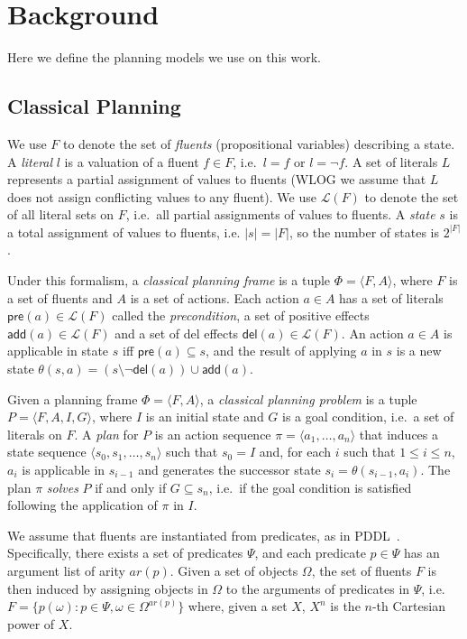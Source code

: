 \documentclass[letterpaper]{article} %
\newcommand{\tup}[1]{{\langle #1 \rangle}}
\newcommand{\pre}{\mathsf{pre}}     %
\newcommand{\del}{\mathsf{del}}     %
\newcommand{\add}{\mathsf{add}}     %
\begin{document}
\section{Background}
Here we define the planning models we use on this work.

\subsection{Classical Planning}
We use $F$ to denote the set of {\em fluents} (propositional variables) describing a state. A {\em literal} $l$ is a valuation of a fluent $f\in F$, i.e.~$l=f$ or $l=\neg f$. A set of literals $L$ represents a partial assignment of values to fluents (WLOG we assume that $L$ does not assign conflicting values to any fluent). We use $\mathcal{L}(F)$ to denote the set of all literal sets on $F$, i.e.~all partial assignments of values to fluents. A {\em state} $s$ is a total assignment of values to fluents, i.e. $|s|=|F|$, so the number of states is $2^{|F|}$. 

Under this formalism, a {\em classical planning frame} is a tuple $\Phi=\tup{F,A}$, where $F$ is a set of fluents and $A$ is a set of actions. Each action $a\in A$ has a set of literals $\pre(a)\in\mathcal{L}(F)$ called the {\em precondition}, a set of positive effects $\add(a)\in\mathcal{L}(F)$ and a set of del effects $\del(a)\in\mathcal{L}(F)$. An action $a\in A$ is applicable in state $s$ iff $\pre(a)\subseteq s$, and the result of applying $a$ in $s$ is a new state $\theta(s,a)=(s\setminus \neg\del(a))\cup\add(a)$.

Given a planning frame $\Phi=\tup{F,A}$, a {\em classical planning problem} is a tuple $P=\tup{F,A,I,G}$, where $I$ is an initial state and $G$ is a goal condition, i.e.~a set of literals on $F$. A {\em plan} for $P$ is an action sequence $\pi=\tup{a_1, \ldots, a_n}$ that induces a state sequence $\tup{s_0, s_1, \ldots, s_n}$ such that $s_0=I$ and, for each $i$ such that {\small $1\leq i\leq n$}, $a_i$ is applicable in $s_{i-1}$ and generates the successor state $s_i=\theta(s_{i-1},a_i)$. The plan $\pi$ {\em solves} $P$ if and only if $G\subseteq s_n$, i.e.~if the goal condition is satisfied following the application of $\pi$ in $I$.

We assume that fluents are instantiated from predicates, as in PDDL~\cite{fox2003pddl2}. Specifically, there exists a set of predicates $\Psi$, and each predicate $p\in\Psi$ has an argument list of arity $ar(p)$. Given a set of objects $\Omega$, the set of fluents $F$ is then induced by assigning objects in $\Omega$ to the arguments of predicates in $\Psi$, i.e.~$F=\{p(\omega):p\in\Psi,\omega\in\Omega^{ar(p)}\}$ where, given a set $X$, $X^n$ is the $n$-th Cartesian power of $X$.
\end{document}
